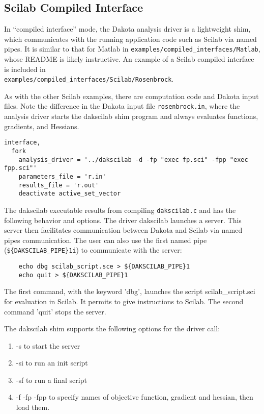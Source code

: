 \subsection{Scilab Compiled Interface} 

In ``compiled interface'' mode, the Dakota analysis driver is a
lightweight shim, which communicates with the running application code
such as Scilab via named pipes.  It is similar to that for Matlab in
\texttt{examples/compiled\_interfaces/Matlab}, whose README is likely
instructive.  An example of a Scilab compiled interface is included in \\
\texttt{examples/compiled\_interfaces/Scilab/Rosenbrock}.

As with the other Scilab examples, there are computation code and
Dakota input files.  Note the difference in the Dakota input file
\texttt{rosenbrock.in}, where the analysis driver starts the dakscilab
shim program and always evaluates functions, gradients, and Hessians.

\begin{small}
\begin{verbatim}
interface,
  fork
    analysis_driver = '../dakscilab -d -fp "exec fp.sci" -fpp "exec fpp.sci"'
    parameters_file = 'r.in'
    results_file = 'r.out'
    deactivate active_set_vector
\end{verbatim} 
\end{small}

The dakscilab executable results from compiling \texttt{dakscilab.c}
and has the following behavior and options.  The driver dakscilab
launches a server.  This server then facilitates communication between
Dakota and Scilab via named pipes communication. The user can also use
the first named pipe (\texttt{\$\{DAKSCILAB\_PIPE\}1i}) to communicate
with the server:
\begin{small}
\begin{verbatim}
    echo dbg scilab_script.sce > ${DAKSCILAB_PIPE}1
    echo quit > ${DAKSCILAB_PIPE}1
\end{verbatim} 
\end{small}
The first command, with the keyword 'dbg', launches the script
scilab\_script.sci for evaluation in Scilab.  It permits to give
instructions to Scilab. The second command 'quit' stops the server.

The dakscilab shim supports the following options for the driver call:
\begin{enumerate}
  \item -s  to start the server
  \item -si to run an init script
  \item -sf to run a final script
  \item -f -fp -fpp to specify names of objective function, gradient
    and hessian, then load them.
\end{enumerate}

